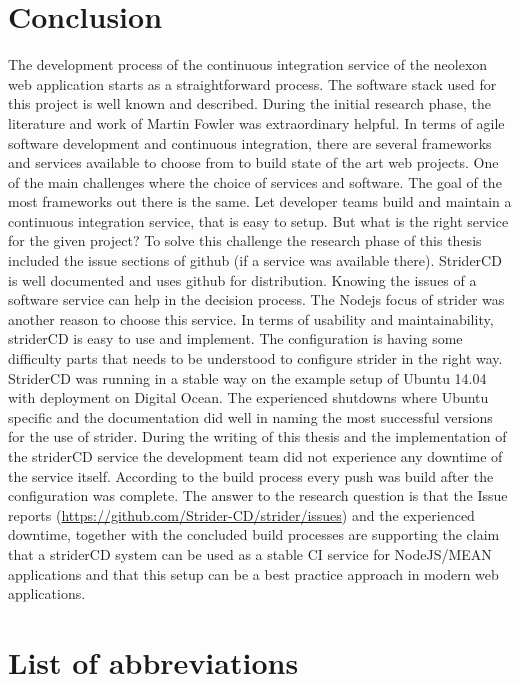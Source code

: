 \section{Conclusion}
\label{section:Conclusion}
The development process of the continuous integration service of the neolexon web application starts as a straightforward process. The software stack
used for this project is well known and described. During the initial research phase, the literature and work of Martin Fowler was extraordinary
helpful. In terms of agile software development and continuous integration, there are several frameworks and services available to choose from to build
state of the art web projects. One of the main challenges where the choice of services and software. The goal of the most frameworks out there is
the same. Let developer teams build and maintain a continuous integration service, that is easy to setup. But what is the right service for the given project?
To solve this challenge the research phase of this thesis included the issue sections of github (if a service was available there). StriderCD is well
documented and uses github for distribution. Knowing the issues of a software service can help in the decision process. The Nodejs focus of strider
was another reason to choose this service. In terms of usability and maintainability, striderCD is easy to use and implement. The configuration is having
some difficulty parts that needs to be understood to configure strider in the right way. StriderCD was running in a stable way on the example setup
of Ubuntu 14.04 with deployment on Digital Ocean. The experienced shutdowns where Ubuntu specific and the documentation did well in naming the most
successful versions for the use of strider. During the writing of this thesis and the implementation of the striderCD service the development team did
not experience any downtime of the service itself. According to the build process every push was build after the configuration was complete. The answer
to the research question is that the Issue reports (\url{https://github.com/Strider-CD/strider/issues}) and the experienced downtime,
together with the concluded build processes are supporting the claim that a striderCD system can be used as a stable CI service for NodeJS/MEAN applications and
that this setup can be a best practice approach in modern web applications.


\newpage
\section{List of abbreviations}
\label{section:List of abbreviations}

